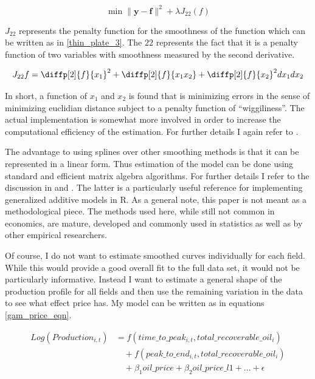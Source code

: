 \documentclass[12pt]{scrartcl} %
\begin{document}
	\begin{equation}
\min \|\boldsymbol{y-f}\|^2 + \lambda J_{22}(f)
\label{thin_plate_2}
	\end{equation}

$J_{22}$ represents the penalty function for the smoothness of the function which can be written as in \ref{thin_plate_3}.  The $22$ represents the fact that it is a penalty function of two variables with smoothness measured by the second derivative.

	\begin{equation}
	J_{22}{f}= \diffp[2]{f}{x_1}^2 + \diffp[2]{f}{{x_1}{x_2}} + \diffp[2]{f}{x_2}^2dx_1 dx_2
\label{thin_plate_3}
	\end{equation}

In short, a function of $x_1$ and $x_2$ is found that is minimizing errors in the sense of minimizing euclidian distance subject to a penalty function of “wiggiliness”.  The actual implementation is somewhat more involved in order to increase the computational efficiency of the estimation.  For further details I again refer to \citet{wood_thin_2003}.

The advantage to using splines over other smoothing methods is that it can be represented in a linear form.  Thus estimation of the model can be done using standard and efficient matrix algebra algorithms. For further details I refer to the discussion in \citet{hastie_generalized_1990} and \citet{wood_generalized_2006}.  The latter is a particularly useful reference for implementing generalized additive models in R.  As a general note, this paper is not meant as a methodological piece.  The methods used here, while still not common in economics, are mature, developed and commonly used in statistics as well as by other empirical researchers.

Of course, I do not want to estimate smoothed curves individually for each field.  While this would provide a good overall fit to the full data set, it would not be particularly informative.  Instead I want to estimate a general shape of the production profile for all fields and then use the remaining variation in the data to see what effect price has.  My model can be written as in equations \ref{gam_price_eqn}.

\begin{equation}
\begin{split}
	Log(Production_{i,t})&=f(time\_to\_peak_{i,t}, total\_recoverable\_oil_i) \\
	& \quad + f(peak\_to\_end_{i,t}, total\_recoverable\_oil_i) \\
	& \quad + \beta_1 oil\_price + \beta_2 oil\_price\_l1 + ... +  \epsilon
\end{split}
\label{gam_price_eqn}
\end{equation}
\end{document}

